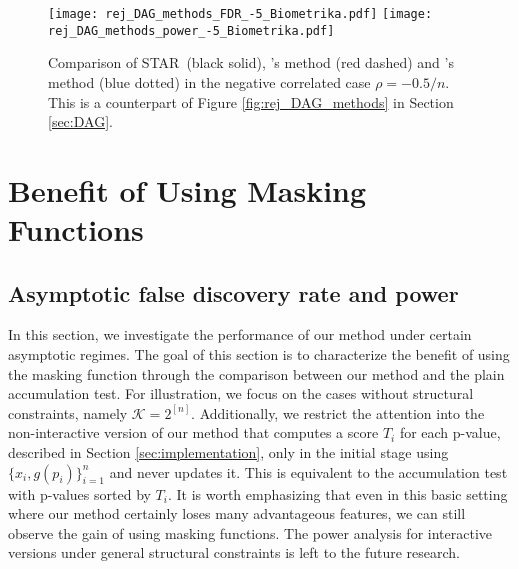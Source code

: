 \documentclass{biometrika}
\newcommand{\cK}{\mathcal{K}}
\renewcommand{\star}{STAR}
\newcommand{\1}{\mathbf{1}}
\begin{document}
\begin{figure}[h]
  \centering
  \texttt{[image: rej\_DAG\_methods\_FDR\_-5\_Biometrika.pdf]}
  \texttt{[image: rej\_DAG\_methods\_power\_-5\_Biometrika.pdf]}
  \caption{Comparison of \star ~(black solid), \cite{lynch16}'s method (red dashed) and \cite{ramdas2017dagger}'s method (blue dotted) in the negative correlated case $\rho = -0.5/n$. This is a counterpart of Figure \ref{fig:rej_DAG_methods} in Section \ref{sec:DAG}.}\label{fig:rej_DAG_methods_-5}
\end{figure}

\clearpage
\newpage

\section{Benefit of Using Masking Functions}\label{app:asymptotics}
\subsection{Asymptotic false discovery rate and power}
In this section, we investigate the performance of our method under certain asymptotic regimes. The goal of this section is to characterize the benefit of using the masking function through the comparison between our method and the plain accumulation test. For illustration, we focus on the cases without structural constraints, namely $\cK = 2^{[n]}$. Additionally, we restrict the attention into the non-interactive version of our method that computes a score $T_{i}$ for each p-value, described in Section \ref{sec:implementation}, only in the initial stage using $\{x_{i}, g(p_{i})\}_{i=1}^{n}$ and never updates it. This is equivalent to the accumulation test with p-values sorted by $T_{i}$. It is worth emphasizing that even in this basic setting where our method certainly loses many advantageous features, we can still observe the gain of using masking functions. The power analysis for interactive versions under general structural constraints is left to the future research. 
\end{document}
